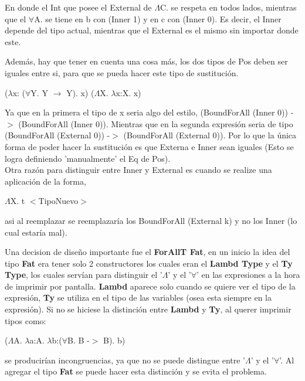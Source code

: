 \documentclass[12pt, titlepage, a4paper]{article}
\begin{document}
\begin{itemize}[label=$\bullet$]
{  En donde el Int que posee el External de $\Lambda$C. se respeta en todos lados, mientras que el $\forall$A. se tiene en b con (Inner 1) y en c con (Inner 0). 
  Es decir, el Inner depende del tipo actual, mientras que el External es el mismo sin importar donde este.

  Además, hay que tener en cuenta una cosa más, los dos tipos de Pos deben ser iguales entre si, para que se pueda hacer este tipo 
  de sustitución.
  
  \begin{center}
    ($\lambda$x: ($\forall$Y. Y $\rightarrow$ Y). x) ($\Lambda$X. $\lambda$x:X. x)
  \end{center} 

  Ya que en la primera el tipo de x seria algo del estilo, (BoundForAll (Inner 0)) -$>$ (BoundForAll (Inner 0)). Mientras que en la segunda expresión seria 
  de tipo (BoundForAll (External 0)) -$>$ (BoundForAll (External 0)). Por lo que la única forma de poder hacer la sustitución es que Externa e Inner sean iguales (Esto 
  se logra definiendo 'manualmente' el Eq de Pos). \\

  Otra razón para distinguir entre Inner y External es cuando se realize una aplicación de la forma,
  \begin{center}
    $\Lambda$X. t $<$TipoNuevo$>$
  \end{center} 
   asi al reemplazar se reemplazaría los BoundForAll (External k) y no los Inner (lo cual estaría mal).
  }
  \end{itemize}

  Una decision de diseño importante fue el \textbf{ForAllT Fat}, en un inicio la idea del tipo \textbf{Fat} era tener solo 2 
  constructores los cuales eran el \textbf{Lambd Type} y el \textbf{Ty Type}, los cuales servían para distinguir el 
  '$\Lambda$' y el '$\forall$' en las expresiones a la hora de imprimir por pantalla. \textbf{Lambd} aparece solo cuando se quiere ver el tipo de 
  la expresión, \textbf{Ty} se utiliza en el tipo de las variables (osea esta siempre en la expresión). Si no se hiciese la distinción entre \textbf{Lambd} y  \textbf{Ty}, al querer imprimir tipos como:

  \begin{center}
    ($\Lambda$A. $\lambda$a:A. $\lambda$b:($\forall$B. B -$>$ B). b)
  \end{center}  

  se producirían incongruencias, ya que no se puede distingue entre '$\Lambda$' y el '$\forall$'. Al agregar el tipo \textbf{Fat} se puede 
  hacer esta distinción  y se evita el problema.\\
\end{document}
